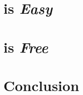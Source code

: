 \documentclass[letterpaper]{article}
\begin{document}
%        
%
%
%
%



    

    \section*{\LaTeXe{} is \textit{Easy}}

    

    \section*{\LaTeXe{} is \textit{Free}}

    

    \section{Conclusion}
    \label{Conclusion}


    \appendix{}
    


    \theendnotes{}

        
    
    \nocite{*}
\end{document}
